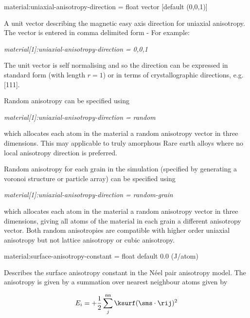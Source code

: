 {\zicf material:uniaxial-anisotropy-direction = float vector [default (0,0,1)]} A unit vector \ei describing the magnetic easy axis direction for uniaxial anisotropy. The vector is entered in comma delimited form - For example:

\textit{material[1]:uniaxial-anisotropy-direction = 0,0,1}

\noindent The unit vector is self normalising and so the direction can be expressed in standard form (with length $r =  1$) or in terms of crystallographic directions, e.g. [111].

\noindent Random anisotropy can be specified using

\textit{material[1]:uniaxial-anisotropy-direction = random}

\noindent which allocates each atom in the material a random anisotropy vector in three dimensions. This may applicable to truly amorphous Rare earth alloys where no local anisotropy direction is preferred.

Random anisotropy for each grain in the simulation (specified by generating a voronoi structure or particle array) can be specified using

\textit{material[1]:uniaxial-anisotropy-direction = random-grain}

which allocates each atom in the material a random anisotropy vector in three dimensions, giving all atoms of the material in each grain a different
anisotropy vector. Both random anisotropies are compatible with higher order uniaxial anisotropy but not lattice anisotropy or cubic anisotropy.



{\zicf material:surface-anisotropy-constant = float default 0.0 (J/atom)} Describes the surface anisotropy constant in the N\'eel pair anisotropy model. The anisotropy is given by a summation over nearest neighbour atoms given by

\begin{equation*}
E_i = +\frac{1}{2} \sum_j^{\mathrm{nn}} \ksurf (\sms \cdot \rij )^2
\end{equation*}

